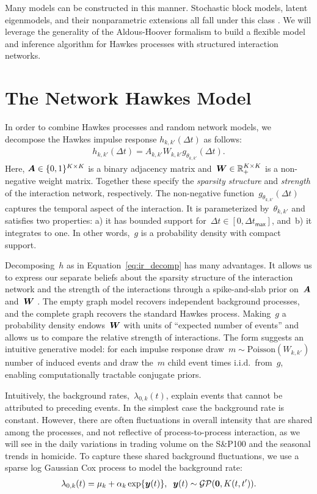 Many models can be constructed in this manner. Stochastic block models, latent eigenmodels, and their nonparametric extensions all fall under this class \cite{Lloyd-2012}. We will leverage the generality of the Aldous-Hoover formalism to build a flexible model and inference algorithm for Hawkes processes with structured interaction networks.

\section{The Network Hawkes Model}\label{sec:basic_model}
In order to combine Hawkes processes and random network models, we decompose the Hawkes impulse response $h_{k,k'}(\Delta t)$ as follows:
\begin{align}
\label{eq:ir_decomp}
h_{k,k'}(\Delta t)=A_{k,k'}W_{k,k'}g_{\theta_{k,k'}}(\Delta t).
\end{align}
Here, ${\boldsymbol{A}\in\{0,1\}^{K\times K}}$ is a binary adjacency matrix and~${\boldsymbol{W}\in\mathbb{R}_+^{K\times K}}$ is a non-negative weight matrix. Together these specify the \emph{sparsity structure} and \emph{strength} of the interaction network, respectively. The non-negative function~${g_{\theta_{k,k'}}(\Delta t)}$ captures the temporal aspect of the interaction. It is parameterized by~${\theta_{k,k'}}$ and satisfies two properties: a) it has bounded support for~${\Delta t \in [0,\Delta t_{\mathsf{max}}]}$, and~b) it integrates to one. In other words,~$g$ is a probability density with compact support.

Decomposing~$h$ as in Equation~\ref{eq:ir_decomp} has many advantages. It allows us to express our separate beliefs about the sparsity structure of the interaction network and the strength of the interactions through a spike-and-slab prior on~$\boldsymbol{A}$ and~$\boldsymbol{W}$ \cite{Mohamed-2012}. 
The empty graph model recovers independent background processes, and the complete graph recovers the standard Hawkes process.
Making~$g$ a probability density endows~$\boldsymbol{W}$ with units of ``expected number of events'' and allows us to compare the relative strength of interactions. The form suggests an intuitive generative model: for each impulse response draw~${m\sim \text{Poisson}(W_{k,k'})}$ number of induced events and draw the~$m$ child event times i.i.d.\ from~$g$, enabling computationally tractable conjugate priors.

Intuitively, the background rates,~$\lambda_{0,k}(t)$, explain events that cannot be attributed to preceding events. In the simplest case the background rate is constant. However, there are often fluctuations in overall intensity that are shared among the processes, and not reflective of process-to-process interaction, as we will see in the daily variations in trading volume on the S\&P100 and the seasonal trends in homicide. To capture these shared background fluctuations, we use a sparse log Gaussian Cox process \cite{Moller-1998} to model the background rate:
\begin{align*}
  \lambda_{0,k}(t)=\mu_{k} + \alpha_{k}\exp\{\boldsymbol{y}(t)\},\;\;\boldsymbol{y}(t)\sim\mathcal{GP}(\boldsymbol{0},K(t,t')).
\end{align*}

